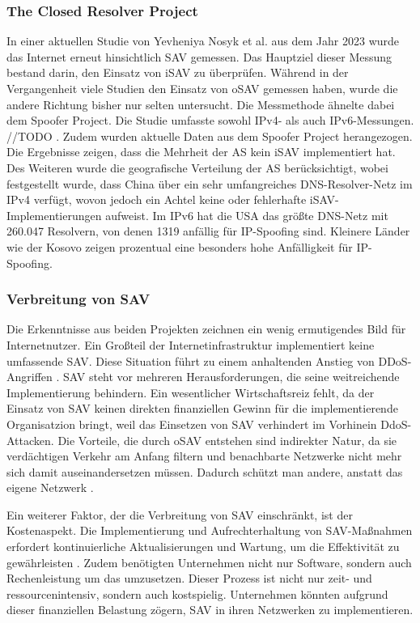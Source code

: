 \documentclass[sigplan,screen]{acmart}
\begin{document}
\subsubsection{The Closed Resolver Project}
In einer aktuellen Studie von Yevheniya Nosyk et al. aus dem Jahr 2023 \cite{CRP01} wurde das Internet erneut hinsichtlich SAV gemessen. Das Hauptziel dieser Messung bestand darin, den Einsatz von iSAV zu überprüfen. Während in der Vergangenheit viele Studien den Einsatz von oSAV gemessen haben, wurde die andere Richtung bisher nur selten untersucht. Die Messmethode ähnelte dabei dem Spoofer Project. Die Studie umfasste sowohl IPv4- als auch IPv6-Messungen. //TODO . Zudem wurden aktuelle Daten aus dem Spoofer Project herangezogen. Die Ergebnisse zeigen, dass die Mehrheit der AS kein iSAV implementiert hat. Des Weiteren wurde die geografische Verteilung der AS berücksichtigt, wobei festgestellt wurde, dass China über ein sehr umfangreiches DNS-Resolver-Netz im IPv4 verfügt, wovon jedoch ein Achtel keine oder fehlerhafte iSAV-Implementierungen aufweist. Im IPv6 hat die USA das größte DNS-Netz mit 260.047 Resolvern, von denen 1319 anfällig für IP-Spoofing sind. Kleinere Länder wie der Kosovo zeigen prozentual eine besonders hohe Anfälligkeit für IP-Spoofing.

\subsubsection{Verbreitung von SAV}

Die Erkenntnisse aus beiden Projekten zeichnen ein wenig ermutigendes Bild für Internetnutzer. Ein Großteil der Internetinfrastruktur implementiert keine umfassende SAV. Diese Situation führt zu einem anhaltenden Anstieg von DDoS-Angriffen \cite{CRP01}. SAV steht vor mehreren Herausforderungen, die seine weitreichende Implementierung behindern. 
Ein wesentlicher Wirtschaftsreiz fehlt, da der Einsatz von SAV keinen direkten finanziellen Gewinn für die implementierende Organisatzion bringt, weil das Einsetzen von SAV verhindert im Vorhinein DdoS-Attacken. Die Vorteile, die durch oSAV entstehen sind indirekter Natur, da sie verdächtigen Verkehr am Anfang filtern und benachbarte Netzwerke nicht mehr sich damit auseinandersetzen müssen. Dadurch schützt man andere, anstatt das eigene Netzwerk \cite{CRP01}.

Ein weiterer Faktor, der die Verbreitung von SAV einschränkt, ist der Kostenaspekt. Die Implementierung und Aufrechterhaltung von SAV-Maßnahmen erfordert kontinuierliche Aktualisierungen und Wartung, um die Effektivität zu gewährleisten \cite{Lone01}. Zudem benötigten Unternehmen nicht nur Software, sondern auch Rechenleistung um das umzusetzen. Dieser Prozess ist nicht nur zeit- und ressourcenintensiv, sondern auch kostspielig. Unternehmen könnten aufgrund dieser finanziellen Belastung zögern, SAV in ihren Netzwerken zu implementieren.
\end{document}
